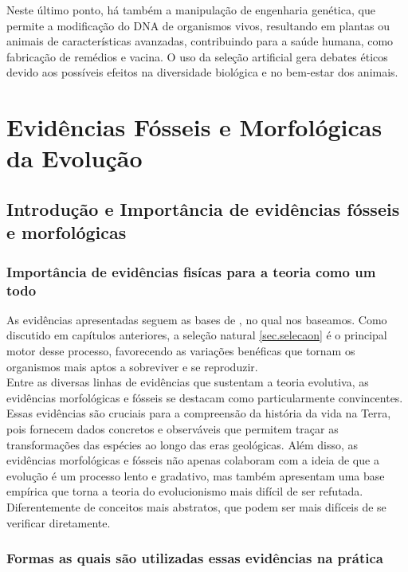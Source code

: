 \documentclass{report}
\begin{document}
Neste último ponto, há também a manipulação de engenharia genética, que permite a modificação do DNA de organismos vivos, resultando em plantas ou animais de características avanzadas, contribuindo para a saúde humana, como fabricação de remédios e vacina. O uso da seleção artificial gera debates éticos devido aos possíveis efeitos na diversidade biológica e no bem-estar dos animais.  

\chapter{Evidências Fósseis e Morfológicas da Evolução}\label{chap.Evidencias}

\section{Introdução e Importância de evidências fósseis e morfológicas}\label{sec.fosseis1}

\subsection{Importância de evidências fisícas para a teoria como um todo}\label{subsec.fosseis1.1}

As evidências apresentadas seguem as bases de \cite{prothero2017evolution}, no qual nos baseamos. Como discutido em capítulos anteriores, a seleção natural \ref{sec.selecaon} é o principal motor desse processo, favorecendo as variações benéficas que tornam os organismos mais aptos a sobreviver e se reproduzir.\\

Entre as diversas linhas de evidências que sustentam a teoria evolutiva, as evidências morfológicas e fósseis se destacam como particularmente convincentes. Essas evidências são cruciais para a compreensão da história da vida na Terra, pois fornecem dados concretos e observáveis que permitem traçar as transformações das espécies ao longo das eras geológicas. Além disso, as evidências morfológicas e fósseis não apenas colaboram com a ideia de que a evolução é um processo lento e gradativo, mas também apresentam uma base empírica que torna a teoria do evolucionismo mais difícil de ser refutada. Diferentemente de conceitos mais abstratos, que podem ser mais difíceis de se verificar diretamente.\\

\subsection{Formas as quais são utilizadas essas evidências na prática}\label{subsec.fosseis1.2}
\end{document}
